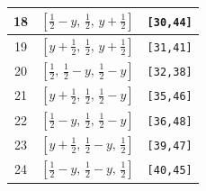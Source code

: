 \documentclass[fleqn,8pt]{jsarticle}
\begin{document}
\begin{longtable}{ccc}
18 & $\left[ \frac{1}{2} - y,\, \frac{1}{2},\, y + \frac{1}{2} \right]$ & {\tt [30,44]} \\ \hline
19 & $\left[ y + \frac{1}{2},\, \frac{1}{2},\, y + \frac{1}{2} \right]$ & {\tt [31,41]} \\ \hline
20 & $\left[ \frac{1}{2},\, \frac{1}{2} - y,\, \frac{1}{2} - y \right]$ & {\tt [32,38]} \\ \hline
21 & $\left[ y + \frac{1}{2},\, \frac{1}{2},\, \frac{1}{2} - y \right]$ & {\tt [35,46]} \\ \hline
22 & $\left[ \frac{1}{2} - y,\, \frac{1}{2},\, \frac{1}{2} - y \right]$ & {\tt [36,48]} \\ \hline
23 & $\left[ y + \frac{1}{2},\, \frac{1}{2} - y,\, \frac{1}{2} \right]$ & {\tt [39,47]} \\ \hline
24 & $\left[ \frac{1}{2} - y,\, \frac{1}{2} - y,\, \frac{1}{2} \right]$ & {\tt [40,45]} \\
\end{longtable}
\renewcommand{\arraystretch}{1.2}
\end{document}
